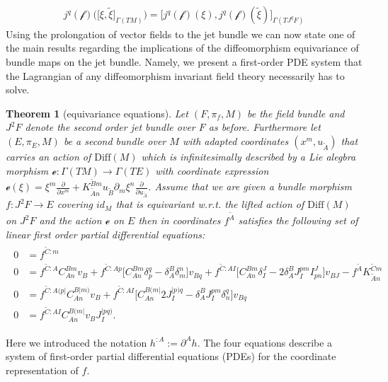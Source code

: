 \documentclass[a4paper,12pt, DIV=14, BCOR=5mm, twoside, headsepline, numbers=noenddot]{scrbook}
\newtheorem{theorem}{Theorem}[section]
\begin{document}
\begin{align}
j^q (\mathcal{f})\bigl (  \bigl [\xi, \tilde{\xi}  \bigr ]_{\Gamma(TM)}\bigr) =  \bigl [ j^q(\mathcal{f})(\xi), j^q(\mathcal{f})(\tilde{\xi}) \bigr ]_{\Gamma(TJ^qF)}
\end{align}
Using the prolongation of vector fields to the jet bundle we can now state one of the main results regarding the implications of the diffeomorphism equivariance of bundle maps on the jet bundle. Namely, we present a first-order PDE system that the Lagrangian of any diffeomorphism invariant field theory necessarily has to solve. 
\begin{theorem}[equivariance equations]
Let $(F,\pi_f,M)$ be the field bundle and $J^2F$ denote the second order jet bundle over $F$ as before. Furthermore let $(E, \pi_E, M)$ be a second bundle over $M$ with adapted coordinates $(x^m, u_{\tilde{A}})$ that carries an action of $\mathrm{Diff}(M)$ which is infinitesimally described by a Lie alegbra morphism $\mathcal{e}: \Gamma(TM) \rightarrow \Gamma(TE)$ with coordinate expression $\mathcal{e}(\xi) = \xi^m \frac{\partial}{\partial x^m} + K_{\tilde{A}n}^{\tilde{B}m} u_{\tilde{B}} \partial_m \xi^n \frac{\partial}{\partial u_{\tilde{A}}}$. Assume that we are given a bundle morphism $f : J^2F \rightarrow E$ covering $id_M$ that is equivariant w.r.t. the lifted action of $\mathrm{Diff}(M)$ on $J^2F$ and the action $\mathcal{e}$ on $E$ then in coordinates $f^{\tilde{A}}$ satisfies the following set of linear first order partial differential equations:
\begin{align}
\begin{aligned}
    0 &= f^{\tilde{C}:m} \\
    0 &= f^{\tilde{C}:A} C_{An}^{Bm} v_B + f^{\tilde{C}:Ap} \bigl[ C_{An}^{Bm} \delta_p^q - \delta_A^B \delta_m^n \bigr] v_{Bq} + f^{\tilde{C}:AI} \bigl[ C_{An}^{Bm} \delta_I^J - 2 \delta_A^B J_I^{pm} I^J_{pn}  \bigr] v_{BJ} - f^{\tilde{A}}K_{\tilde{A}n}^{\tilde{C}m}\\
    0 &= f^{\tilde{C}:A(p\vert}C_{An}^{B \vert m)} v_B + f^{\tilde{C}: AI} \bigl[ C_{An}^{B(m\vert} 2 J_I^{\vert p) q} - \delta^B_A J_I ^{pm} \delta_n^q \bigr] v_{Bq} \\
    0 &= f^{\tilde{C}:AI} C_{An}^{B(m\vert} v_B J_I^{\vert p q )}.
\end{aligned}
\end{align}
\end{theorem}
Here we introduced the notation $h^{:A} := \partial^A h$. The four equations describe a system of first-order partial differential equations (PDEs) for the coordinate representation of $f$. 
\end{document}
